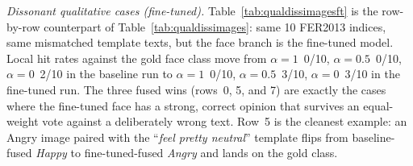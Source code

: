 \documentclass[sigconf,nonacm]{acmart}
\begin{document}
\emph{Dissonant qualitative cases (fine-tuned).} Table~\ref{tab:qualdissimagesft} is the row-by-row counterpart of Table~\ref{tab:qualdissimages}: same 10 FER2013 indices, same mismatched template texts, but the face branch is the fine-tuned model. Local hit rates against the gold face class move from $\alpha\!=\!1$~0/10, $\alpha\!=\!0.5$~0/10, $\alpha\!=\!0$~2/10 in the baseline run to $\alpha\!=\!1$~0/10, $\alpha\!=\!0.5$~3/10, $\alpha\!=\!0$~3/10 in the fine-tuned run. The three fused wins (rows~0, 5, and 7) are exactly the cases where the fine-tuned face has a strong, correct opinion that survives an equal-weight vote against a deliberately wrong text. Row~5 is the cleanest example: an Angry image paired with the ``\emph{feel pretty neutral}'' template flips from baseline-fused \emph{Happy} to fine-tuned-fused \emph{Angry} and lands on the gold class.
\end{document}
